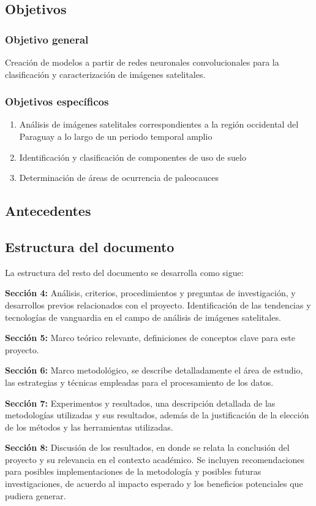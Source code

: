 \subsection{Objetivos}

\subsubsection{Objetivo general}

Creación de modelos a partir de redes neuronales convolucionales para la clasificación y caracterización de imágenes satelitales.

\subsubsection{Objetivos específicos}

\begin{enumerate}
    \item Análisis de imágenes satelitales correspondientes a la región occidental del Paraguay a lo largo de un periodo temporal amplio 
    \item Identificación y clasificación de componentes de uso de suelo
    \item Determinación de áreas de ocurrencia de paleocauces
\end{enumerate}

\subsection{Antecedentes}

\subsection{Estructura del documento}

La estructura del resto del documento se desarrolla como sigue:

{\bf Sección 4:} Análisis, criterios, procedimientos y preguntas de investigación, y desarrollos previos relacionados con el proyecto. Identificación de las tendencias y tecnologías de vanguardia en el campo de análisis de imágenes satelitales.

{\bf Sección 5:} Marco teórico relevante, definiciones de conceptos clave para este proyecto.

{\bf Sección 6:} Marco metodológico, se describe detalladamente el área de estudio, las estrategias y técnicas empleadas para el procesamiento de los datos.

{\bf Sección 7:} Experimentos y resultados, una descripción detallada de las metodologías utilizadas y sus resultados, además de la justificación de la elección de los métodos y las herramientas utilizadas.

{\bf Sección 8:} Discusión de los resultados, en donde se relata la conclusión del proyecto y su relevancia en el contexto académico. Se incluyen recomendaciones para posibles implementaciones de la metodología y posibles futuras investigaciones, de acuerdo al impacto esperado y los beneficios potenciales que pudiera generar.

